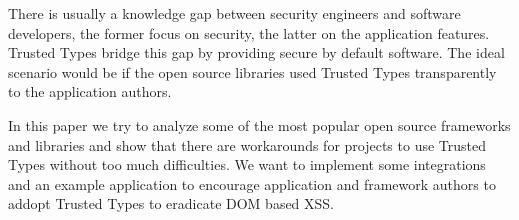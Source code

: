There is usually a knowledge gap between security engineers and software developers, the former
focus on security, the latter on the application features. Trusted Types bridge this gap by
providing secure by default software. The ideal scenario would be if the open source libraries used
Trusted Types transparently to the application authors.

In this paper we try to analyze some of the most popular open source frameworks and libraries and
show that there are workarounds for projects to use Trusted Types without too much difficulties. We
want to implement some integrations and an example application to encourage application and
framework authors to addopt Trusted Types to eradicate DOM based XSS.
